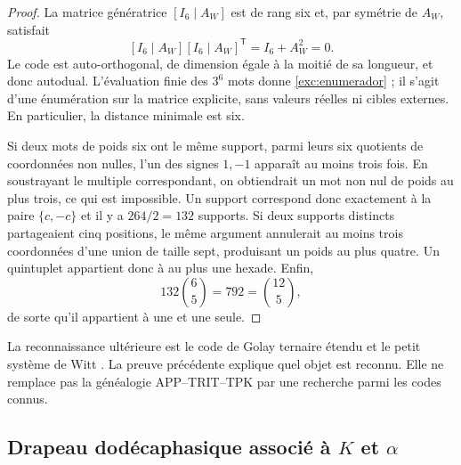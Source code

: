 \begin{proof}
La matrice génératrice $[I_6\mid A_W]$ est de rang six et, par symétrie de $A_W$, satisfait
\[
 [I_6\mid A_W][I_6\mid A_W]^{\mathsf T}
   =I_6+A_W^2=0.
\]
Le code est auto-orthogonal, de dimension égale à la moitié de sa longueur, et donc
autodual. L'évaluation finie des $3^6$ mots donne
\eqref{exc:enumerador} ; il s'agit d'une énumération sur la matrice explicite,
sans valeurs réelles ni cibles externes. En particulier, la distance
minimale est six.

Si deux mots de poids six ont le même support, parmi leurs six quotients de coordonnées non nulles, l'un des signes $1,-1$ apparaît au moins trois fois. En soustrayant le multiple correspondant, on obtiendrait un mot non nul de poids au plus trois, ce qui est impossible. Un support correspond donc exactement à la paire $\{c,-c\}$ et il y a $264/2=132$ supports. Si deux supports distincts partageaient cinq positions, le même argument annulerait au moins trois coordonnées d'une union de taille sept, produisant un poids au plus quatre. Un quintuplet appartient donc à au plus une hexade. Enfin,
\[
 132\binom65=792=\binom{12}5,
\]
de sorte qu'il appartient à une et une seule.
\end{proof}

La reconnaissance ultérieure est le code de Golay ternaire étendu et
le petit système de Witt \cite{conwaysloane}. La preuve précédente explique quel objet est
reconnu. Elle ne remplace pas la généalogie APP--TRIT--TPK par une recherche
parmi les codes connus.

\subsection{Drapeau dodécaphasique associé à \texorpdfstring{$K$ et $\alpha$}{K et alpha}}
\label{exc:bandera}



